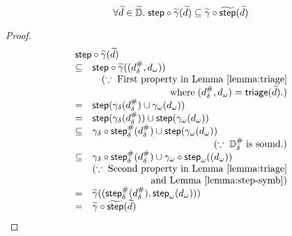 \begin{lemma}\label{lemma:comb-sound2}
  \[
    \forall \widetilde{d} \in \widetilde{\mathbb{D}}. \; \textsf{step} \circ \widetilde{\gamma}(\widetilde{d}) \subseteq
    \widetilde{\gamma} \circ \widetilde{\textsf{step}}(\widetilde{d})\\
  \]
\end{lemma}
\begin{proof}
  \[
    \begin{array}{cl}
      \multicolumn{2}{l}{
        \step \circ \combgamma(\combelem)
      }\\
      \subseteq& \step \circ \combgamma((\sabselem, \symbelem))\\
       & \multicolumn{1}{r}{(\because \; \text{First property in
       Lemma~\ref{lemma:triage}}}\\
       & \multicolumn{1}{r}{\text{where} \; (\sabselem, \symbelem)
       = \triage(\combelem).)}\\

      =& \step(\sgamma(\sabselem) \cup \symbgamma(\symbelem))\\
      =& \step(\sgamma(\sabselem)) \cup \step(\symbgamma(\symbelem))\\
      \subseteq& \sgamma \circ \sabsstep(\sabselem) \cup \step(\symbgamma(\symbelem))\\
      & \multicolumn{1}{r}{(\because \; \sabsdom \; \text{is sound.})}\\
      \subseteq& \sgamma \circ \sabsstep(\sabselem) \cup \symbgamma \circ
      \symbstep((\symbelem))\\
               & \multicolumn{1}{r}{(\because \; \text{Sceond property in
               Lemma~\ref{lemma:triage}} }\\
               & \multicolumn{1}{r}{\text{and Lemma~\ref{lemma:step-symb}})}\\
      =& \combgamma((\sabsstep(\sabselem), \symbstep(\symbelem)))\\
      =& \combgamma \circ \combstep(\combelem)\\

    \end{array}
  \]
\end{proof}

